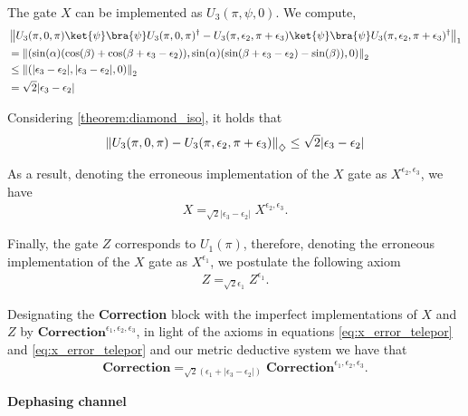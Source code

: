 \begin{example}
    The gate $X$ can be implemented as $U_3(\pi, \psi, 0)$. We compute,
    \begin{align*}
      &\tracenorm{U_3(\pi, 0 , \pi) \ket{\psi}\bra{\psi}U_3(\pi,0,\pi)^\dag - U_3(\pi,\epsilon_2,\pi+\epsilon_3)  \ket{\psi}\bra{\psi}U_3(\pi,\epsilon_2,\pi+\epsilon_3)^\dag}  \\
      & =\euclideannorm{( \sin(\alpha) (\cos(\beta)+\cos(\beta + \epsilon_3-\epsilon_2)), \sin(\alpha) (\sin(\beta + \epsilon_3-\epsilon_2)-\sin(\beta)),0 )} \\
      &  \leq \euclideannorm{(|\epsilon_3-\epsilon_2|, |\epsilon_3-\epsilon_2|,0 )} \\
      & = \sqrt{2} |\epsilon_3-\epsilon_2|
    \end{align*}

    Considering \autoref{theorem:diamond_iso}, it holds that
    \begin{align*}
      \left\lVert U_3(\pi, 0 , \pi)- U_3(\pi,\epsilon_2,\pi+\epsilon_3)  \right\rVert_{\diamondsuit} \leq \sqrt{2} |\epsilon_3-\epsilon_2|
    \end{align*}

    As a result, denoting the erroneous implementation of the $X$ gate as $X^{\epsilon_2, \epsilon_3}$, we have
    \begin{align} \label{eq:x_error_telepor}
      X =_{\sqrt{2} |\epsilon_3-\epsilon_2|} X^{\epsilon_2, \epsilon_3}.
    \end{align}
  

    Finally, the gate $Z$ corresponds to $U_1(\pi)$, therefore, denoting the erroneous implementation of the $X$ gate as $X^{\epsilon_1}$, we postulate the following axiom
    \begin{align} \label{eq:Correction_error_telepor}
      Z =_{\sqrt{2} \epsilon_1} Z^{\epsilon_1}.
    \end{align}

    Designating the \textbf{Correction} block with the imperfect implementations of $X$ and $Z$ by $\textbf{Correction}^{\epsilon_1, \epsilon_2, \epsilon_3}$, in light of the axioms in equations \eqref{eq:x_error_telepor} and \eqref{eq:x_error_telepor} and our metric deductive system we have that
    \begin{align} \label{eq:z_error_telepor}
      \textbf{Correction} =_{\sqrt{2} \left(\epsilon_1 +|\epsilon_3-\epsilon_2| \right)} \textbf{Correction}^{\epsilon_1, \epsilon_2, \epsilon_3}.
    \end{align}


     \textbf{Dephasing channel}


\end{example}
